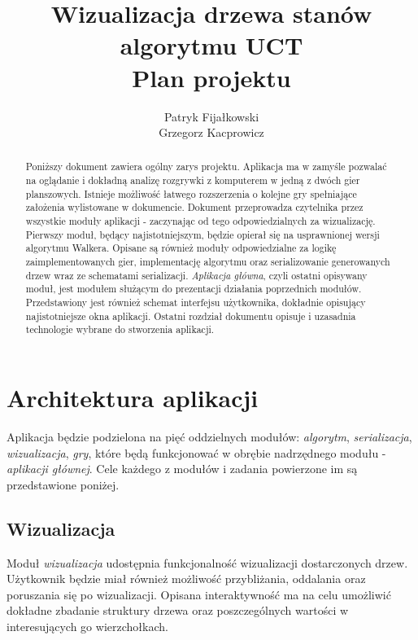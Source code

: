 \documentclass{article}
\title{
	Wizualizacja drzewa stanów algorytmu UCT \\
	\large Plan projektu}
\author{Patryk Fijałkowski \\ Grzegorz Kacprowicz}
\let\oldsection\section
\renewcommand\section{\clearpage\oldsection}
\newcommand{\modulename}[1]{\textit{#1}}
\begin{document}
	\begin{titlingpage}
		\maketitle
		\vspace{3cm}
		\begin{abstract}
			Poniższy dokument zawiera ogólny zarys projektu. Aplikacja ma w zamyśle pozwalać na oglądanie i dokładną analizę rozgrywki z komputerem w jedną z dwóch gier planszowych. Istnieje możliwość łatwego rozszerzenia o kolejne gry spełniające założenia wylistowane w dokumencie. Dokument przeprowadza czytelnika przez wszystkie moduły aplikacji - zaczynając od tego odpowiedzialnych za wizualizację. Pierwszy moduł, będący najistotniejszym, będzie opierał się na usprawnionej wersji algorytmu Walkera. Opisane są również moduły odpowiedzialne za logikę zaimplementowanych gier, implementację algorytmu oraz serializowanie generowanych drzew wraz ze schematami serializacji. \modulename{Aplikacja główna}, czyli ostatni opisywany moduł, jest modułem służącym do prezentacji działania poprzednich modułów. Przedstawiony jest również schemat interfejsu użytkownika, dokładnie opisujący najistotniejsze okna aplikacji. Ostatni rozdział dokumentu opisuje i uzasadnia technologie wybrane do stworzenia aplikacji.
		\end{abstract}
	\end{titlingpage}

	\begin{versionhistory}
	\end{versionhistory}
	\tableofcontents
	
	\section{Architektura aplikacji}
	Aplikacja będzie podzielona na pięć oddzielnych modułów: \modulename{algorytm}, \modulename{serializacja}, \modulename{wizualizacja}, \modulename{gry}, które będą funkcjonować w obrębie nadrzędnego modułu - \modulename{aplikacji głównej}. Cele każdego z modułów i zadania powierzone im są przedstawione poniżej.
	
	\subsection{Wizualizacja}
	Moduł \modulename{wizualizacja} udostępnia funkcjonalność wizualizacji dostarczonych drzew. Użytkownik będzie miał również możliwość przybliżania, oddalania oraz poruszania się po wizualizacji. Opisana interaktywność ma na celu umożliwić dokładne zbadanie struktury drzewa oraz poszczególnych wartości w interesujących go wierzchołkach. \\
	
\end{document}
